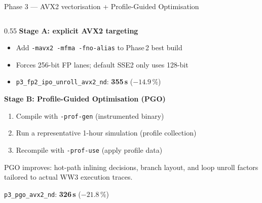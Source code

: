 \documentclass[aspectratio=169,10pt]{beamer}
\begin{document}
\begin{frame}[shrink=12]{Phase 3 --- AVX2 vectorisation + Profile-Guided Optimisation}

  \begin{columns}[T]
    \begin{column}{0.55\textwidth}
      \textbf{Stage A: explicit AVX2 targeting}
      \begin{itemize}
        \item Add \texttt{-mavx2 -mfma -fno-alias} to Phase\,2 best build
        \item Forces 256-bit FP lanes; default SSE2 only uses 128-bit
        \item \texttt{p3\_fp2\_ipo\_unroll\_avx2\_nd}: \textbf{355\,s}
              ($-14.9$\,\%)
      \end{itemize}

      \vspace{0.5em}
      \textbf{Stage B: Profile-Guided Optimisation (PGO)}
      \begin{enumerate}
        \item Compile with \texttt{-prof-gen} (instrumented binary)
        \item Run a representative 1-hour simulation (profile collection)
        \item Recompile with \texttt{-prof-use} (apply profile data)
      \end{enumerate}
      PGO improves: hot-path inlining decisions, branch layout,
      and loop unroll factors tailored to actual WW3 execution traces.

      \vspace{0.4em}
      \texttt{p3\_pgo\_avx2\_nd}: \textbf{326\,s} ($-21.8$\,\%)
    \end{column}


\end{columns}
\end{frame}
\end{document}
